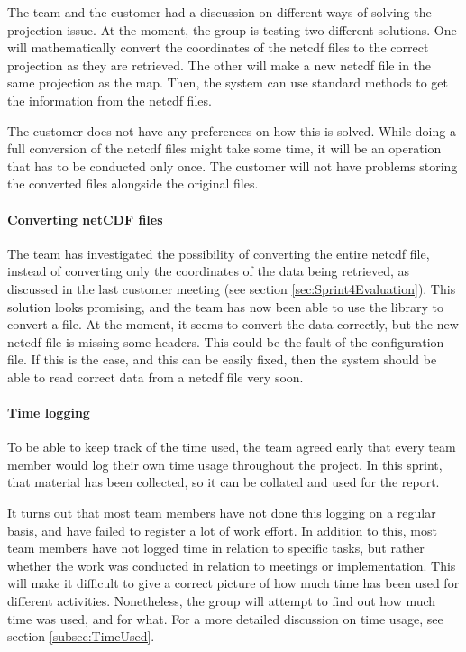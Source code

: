 \documentclass[11pt,a4paper,titlepage,oneside]{report}
\begin{document}
The team and the customer had a discussion on different ways of solving the projection issue. At the moment, the group is testing two different solutions. One will mathematically convert the coordinates of the \gls{netcdf} files to the correct projection as they are retrieved. The other will make a new \gls{netcdf} file in the same projection as the map. Then, the system can use standard methods to get the information from the \gls{netcdf} files. 

The customer does not have any preferences on how this is solved. While doing a full conversion of the \gls{netcdf} files might take some time, it will be an operation that has to be conducted only once. The customer will not have problems storing the converted files alongside the original files. 

\paragraph{Converting netCDF files}
The team has investigated the possibility of converting the entire \gls{netcdf} file, instead of converting only the coordinates of the data being retrieved, as discussed in the last customer meeting (see section \ref{sec:Sprint4Evaluation}). This solution looks promising, and the team has now been able to use the library to convert a file. At the moment, it seems to convert the data correctly, but the new \gls{netcdf} file is missing some headers. This could be the fault of the configuration file. If this is the case, and this can be easily fixed, then the system should be able to read correct data from a \gls{netcdf} file very soon.

\paragraph{Time logging}
To be able to keep track of the time used, the team agreed early that every team member would log their own time usage throughout the project. In this sprint, that material has been collected, so it can be collated and used for the report. 

It turns out that most team members have not done this logging on a regular basis, and have failed to register a lot of work effort. In addition to this, most team members have not logged time in relation to specific tasks, but rather whether the work was conducted in relation to meetings or implementation. This will make it difficult to give a correct picture of how much time has been used for different activities. Nonetheless, the group will attempt to find out how much time was used, and for what. For a more detailed discussion on time usage, see section \ref{subsec:TimeUsed}.
\end{document}

